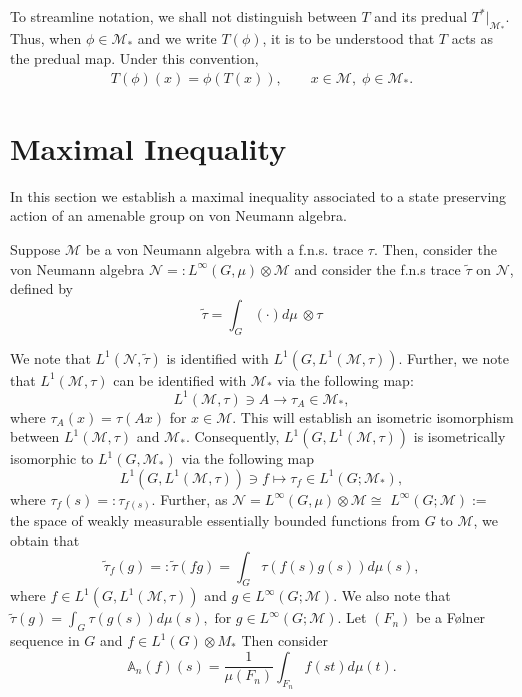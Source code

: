 \documentclass[11pt]{amsart}
\theoremstyle{definition}
\theoremstyle{myremark}
\numberwithin{equation}{section}
\def\A{\mathbb A}
\newcommand{\CM}{\mathcal{M}}
\newcommand{\CN}{\mathcal{N}}
\begin{document}
To streamline notation, we shall not distinguish between \(T\) and its predual \(T^{*}|_{\mathcal{M}_*}\). Thus, when \(\phi \in \mathcal{M}_{*}\) and we write \(T(\phi)\), it is to be understood that \(T\) acts as the predual map. Under this convention,
\begin{align}\label{predualmap}
    T(\phi)(x) = \phi(T(x)),
    \qquad x \in \mathcal{M},\; \phi \in \mathcal{M}_{*}.
\end{align}













\section{\textbf{Maximal Inequality}}\label{Maximal Inequality}
In this section we establish a maximal inequality associated to a state preserving action of an amenable group  on von Neumann algebra. 


Suppose  $ \CM$ be a von Neumann algebra with a f.n.s. trace $\tau$. Then, consider the von Neumann algebra $\CN =: L^\infty(G, \mu) \otimes \CM$  and consider the f.n.s trace $\widetilde{\tau}$ on $\CN$, defined by 
$$ \widetilde{\tau}= \int_G( \cdot ) d\mu  ~\otimes \tau $$


We note that $ L^1(\CN, \widetilde{\tau})$ is identified with 
$ L^1\left(G, L^1(\CM, \tau) \right)$. Further, we note that  
$ L^1(\CM, \tau)$ can be identified with $\CM_*$ via the following map: 
$$ L^1(\CM, \tau) \ni A \to \tau_A \in \CM_*, $$
where $\tau_A(x) = \tau(Ax) $ for $ x \in \CM$. This will establish an isometric  isomorphism between $ L^1(\CM, \tau)$ and  $\CM_*$. Consequently, $ L^1\left(G, L^1(\CM, \tau) \right)$ is isometrically isomorphic to  $ L^1(G, \CM_*)$  via the following map 
$$ L^1\left(G, L^1(\CM, \tau) \right) \ni f \mapsto 
\tau_f \in L^1(G; \CM_*), $$
where $ \tau_f(s) =: \tau_{ f(s)}$. 
Further, as  $\CN= L^\infty(G, \mu) \otimes \CM \cong $ $L^\infty(G; \CM):=$ the space of weakly measurable essentially bounded functions from $G$ to $\CM$, we obtain that 
$$ \widetilde{\tau}_f(g) =:\widetilde{ \tau}(f g ) = \int_G \tau( f(s) g(s) ) d\mu(s),$$
where $f \in L^1\left( G, L^1(\CM, \tau) \right)$   and   $g \in   L^\infty(G; \CM)$. We also note that $ \widetilde{\tau}( g) = \int_G \tau( g(s)) d\mu(s), \text{ for } g \in L^\infty(G; \CM)$.
Let $ (F_n)$ be a F\o lner sequence in $G$ and $ f \in L^1( G) \otimes M_{ *}$
Then consider 
$$ \A_n(f)(s) = \frac{ 1}{ \mu( F_n)}\int_{ F_n} f(st) d\mu(t).$$
\end{document}
